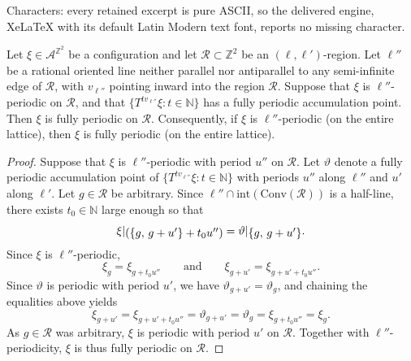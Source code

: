\documentclass[10pt,a4paper]{amsart}
\newcommand{\bb}[1]{\mathbb{#1}}
\newcommand{\sob}[1]{\ensuremath{{\mathbin |}\raise-.4ex\hbox{$#1$}}}
\begin{document}
Characters: every retained excerpt is pure ASCII, so the delivered engine, XeLaTeX with its default Latin Modern text font, reports no missing character.
\begin{lemma}\label{lem:accumulation_fully_periodic}
Let $\xi \in \mathcal{A}^{\mathbb{Z}^2}$ be a configuration and let
$\mathcal{R} \subset \mathbb{Z}^2$ be an $(\pmb{\ell},\pmb{\ell}')$-region.
Let $\pmb{\ell}''$ be a rational oriented line neither parallel nor antiparallel to any semi-infinite edge of $\mathcal{R}$, with $v_{\pmb{\ell}''}$ pointing inward into the region $\mathcal{R}$. Suppose that $\xi$ is $\ell''$-periodic on 
$\mathcal{R}$, and that $\{T^{t v_{\pmb{\ell}''}} \xi : t \in \bb{N}\}$ has a fully periodic accumulation point. Then $\xi$ is fully periodic on $\mathcal{R}$. Consequently, if $\xi$ is $\ell''$-periodic (on the entire lattice), then $\xi$ is fully periodic (on the entire lattice).
\end{lemma}

\begin{proof}
Suppose that $\xi$ is $\ell''$-periodic with period $u''$ on $\mathcal{R} $.
Let $\vartheta$ denote a fully periodic accumulation point of $\{T^{t v_{\pmb{\ell}''}} \xi : t \in \bb{N}\}$
with periods $u''$ along $\ell''$ and $u'$ along $\ell'$.
Let $g \in \mathcal{R}$ be arbitrary. Since $\pmb{\ell}'' \cap \mathrm{int}(\mathrm{Conv}(\mathcal{R}))$ is a
half-line, there exists $t_0 \in \bb{N}$ large enough so that 
\[
\xi\sob{(\{g ,\, g + u' \}+ t_0 u'')}
= \vartheta\sob{\{g,\, g + u'\}}.
\]
Since $\xi$ is $\ell''$-periodic,
\[
\xi_g = \xi_{g + t_0 u''}
\qquad\text{and}\qquad
\xi_{g + u'} = \xi_{g + u' + t_0 u''}.
\]
Since $\vartheta$ is periodic with period $u'$, we have
$\vartheta_{g+u'} = \vartheta_g$, and chaining the equalities above
yields
\[
\xi_{g+u'}
= \xi_{g + u' + t_0 u''}
= \vartheta_{g + u'}
= \vartheta_g
= \xi_{g + t_0 u''}
= \xi_g.
\]
As $g \in \mathcal{R}$ was arbitrary, $\xi$ is periodic with period
$u'$ on $\mathcal{R}$. Together with $\ell''$-periodicity, $\xi$ is
thus fully periodic on $\mathcal{R}$.
\end{proof}
\end{document}
